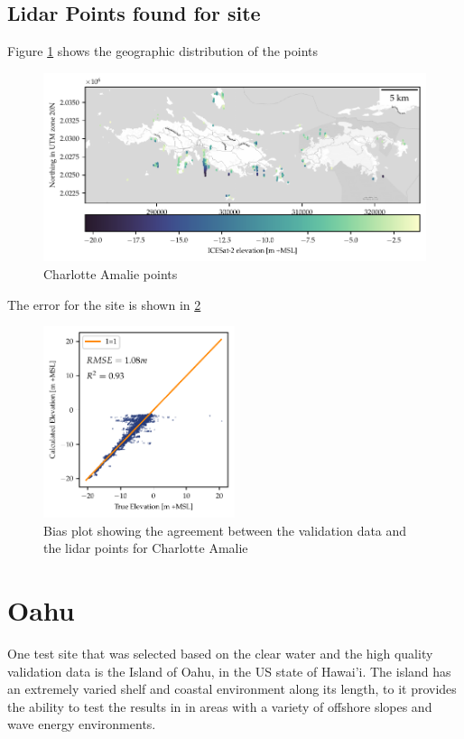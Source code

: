 \subsection{Lidar Points found for site}
Figure \ref{fig:pointmapcharlotteamalie} shows the geographic distribution of the points

\begin{figure}[h]
    \centering
    \includegraphics[width=\textwidth]{figures/Charlotteamalie_photon_map.pdf}
    \caption{Charlotte Amalie points}
    \label{fig:pointmapcharlotteamalie}
\end{figure}

The error for the site is shown in \ref{fig:charlotteamalie-lidar-bias}

\begin{figure}[h]
    \centering
    \includegraphics[width=0.5\textwidth]{figures/charlotteamalie_lidar_estimated_vs_truth.pdf}
    \caption{Bias plot showing the agreement between the validation data and the lidar points for Charlotte Amalie}
    \label{fig:charlotteamalie-lidar-bias}
\end{figure}


\section{Oahu}
One test site that was selected based on the clear water and the high quality validation data is the Island of Oahu, in the US state of Hawai'i. The island has an extremely varied shelf and coastal environment along its length, to it provides the ability to test the results in in areas with a variety of offshore slopes and wave energy environments.

